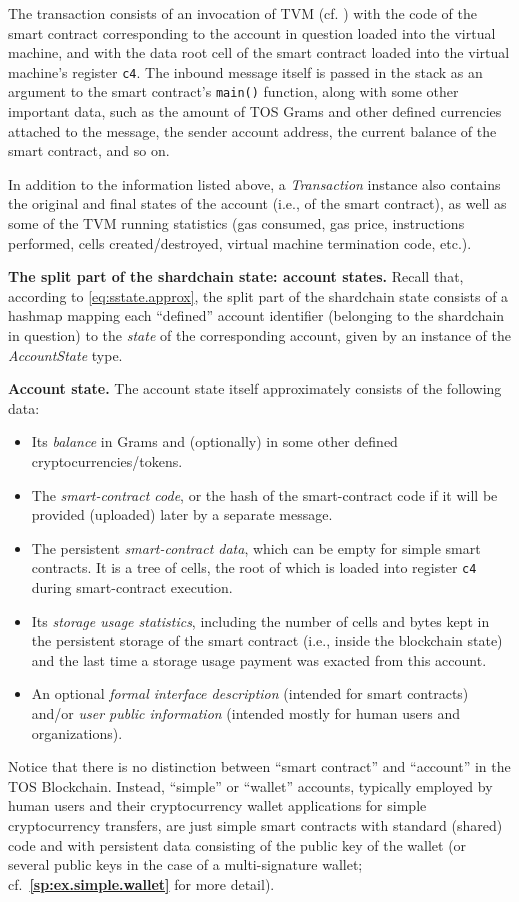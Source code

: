 \documentclass[12pt,oneside]{article}
\def\makepoint#1{\medbreak\noindent{\bf #1.\ }}
\def\nxsubpoint{\refstepcounter{subsubsection}%
  \smallbreak\makepoint{\thesubsubsection}}
\def\refpoint#1{{\rm\textbf{\ref{#1}}}}
\let\ptref=\refpoint
\def\emb#1{\textbf{#1.}}
\begin{document}
The transaction consists of an invocation of TVM (cf. \cite{TVM}) with the code of the smart contract corresponding to the account in question loaded into the virtual machine, and with the data root cell of the smart contract loaded into the virtual machine's register \texttt{c4}. The inbound message itself is passed in the stack as an argument to the smart contract's {\tt main()} function, along with some other important data, such as the amount of TOS Grams and other defined currencies attached to the message, the sender account address, the current balance of the smart contract, and so on.

In addition to the information listed above, a {\em Transaction\/} instance also contains the original and final states of the account (i.e., of the smart contract), as well as some of the TVM running statistics (gas consumed, gas price, instructions performed, cells created/destroyed, virtual machine termination code, etc.).

\nxsubpoint\emb{The split part of the shardchain state: account states}
Recall that, according to \eqref{eq:sstate.approx}, the split part of the shardchain state consists of a hashmap mapping each ``defined'' account identifier (belonging to the shardchain in question) to the {\em state\/} of the corresponding account, given by an instance of the {\em AccountState\/} type.

\nxsubpoint\emb{Account state}
The account state itself approximately consists of the following data:
\begin{itemize}
\item Its {\em balance} in Grams and (optionally) in some other defined cryptocurrencies/tokens.
\item The {\em smart-contract code}, or the hash of the smart-contract code if it will be provided (uploaded) later by a separate message.
\item The persistent {\em smart-contract data}, which can be empty for simple smart contracts. It is a tree of cells, the root of which is loaded into register {\tt c4} during smart-contract execution.
\item Its {\em storage usage statistics}, including the number of cells and bytes kept in the persistent storage of the smart contract (i.e., inside the blockchain state) and the last time a storage usage payment was exacted from this account.
\item An optional {\em formal interface description} (intended for smart contracts) and/or {\em user public information} (intended mostly for human users and organizations).
\end{itemize}
Notice that there is no distinction between ``smart contract'' and ``account'' in the TOS Blockchain. Instead, ``simple'' or ``wallet'' accounts, typically employed by human users and their cryptocurrency wallet applications for simple cryptocurrency transfers, are just simple smart contracts with standard (shared) code and with persistent data consisting of the public key of the wallet (or several public keys in the case of a multi-signature wallet; cf.~\ptref{sp:ex.simple.wallet} for more detail).
\end{document}
